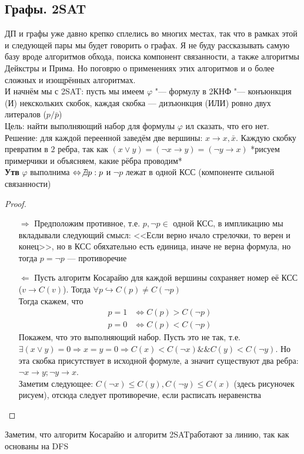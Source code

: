 \documentclass[a4paper, 12pt]{article}
\theoremstyle{plain}
\theoremstyle{definition}
\theoremstyle{remark}
\begin{document}
\subsection{Графы. 2SAT}
ДП и графы уже давно крепко сплелись во многих местах, так что в рамках этой и следующей пары мы будет говорить о графах. Я не буду рассказывать самую базу вроде алгоритмов обхода, поиска компонент связанности, а также алгоритмы Дейкстры и Прима. Но поговрю о применениях этих алгоритмов и о более сложных и изощрённых алгоритмах.\\
И начнём мы с 2SAT: пусть мы имеем $\varphi$ "--- формулу в 2КНФ "--- конъюнкция (И) некскольких скобок, каждая скобка --- дизъюнкция (ИЛИ) ровно двух литералов ($p/\bar{p}$)\\
Цель: найти выполняющий набор для формулы $\varphi$ ил сказать, что его нет.\\
Решение: для каждой переенной заведём две вершины: $x\to x,\bar{x}$. Каждую скобку превратим в $2$ ребра, так как $(x\vee y)=(\neg x\rightarrow y) = (\neg y \rightarrow x)$ *рисуем примерчики и объясняем, какие рёбра проводим*\\
\textbf{Утв} $\varphi$ выполнима $\Leftrightarrow \not\exists p:p$ и $\neg p$ лежат в одной КСС (компоненте сильной связанности)
\newpage
\begin{proof}
	$\text{ }$
	\begin{itemize}
		\item[$\Rightarrow$]Предположим противное, т.е. $p,\neg p\in$ одной КСС, в импликацию мы вкладывали следующий смысл: <<Если верно нчало стрелочки, то верен и конец>>, но в КСС обяхательно есть единица, иначе не верна формула, но тогда $p=\neg p$ --- противоречие
		\item[$\Leftarrow$] Пусть алгоритм Косарайю для каждой вершины сохраняет номер её КСС ($v\to C(v)$). Тогда $\forall p\hookrightarrow C(p)\not=C(\neg p)$\\
		Тогда скажем, что \begin{align*}
			p=1&\Leftrightarrow C(p)>C(\neg p)\\
			p=0&\Leftrightarrow C(p)<C(\neg p)
		\end{align*}
		Покажем, что это выполняющий набор. Пусть это не так, т.е. $\exists (x\vee y)=0 \Rightarrow x=y=0 \Rightarrow C(x)<C(\neg x) \&\& C(y)<C(\neg y)$. Но эта скобка присутствует в исходной формуле, а значит существуют два ребра: $\neg x\to y; \neg y\to x$.\\
		Заметим следующее: $C(\neg x)\leq C(y), C(\neg y)\leq C(x)$ (здесь рисуночек рисуем), отсюда следует противоречие, если расписать неравенства
	\end{itemize}
\end{proof}
Заметим, что алгоритм Косарайю и алгоритм 2SATработают за линию, так как основаны на DFS
\end{document}
